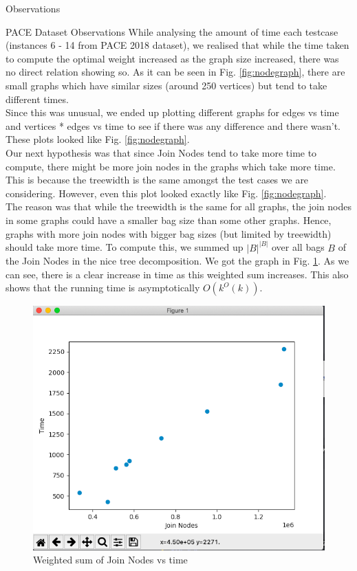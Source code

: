 \begin{section}{Observations}
\begin{subsection}{PACE Dataset Observations}
	While analysing the amount of time each testcase (instances 6 - 14 from PACE 2018 dataset), we realised that while the time taken to compute the optimal weight increased as the graph size increased, there was no direct relation showing so. As it can be seen in Fig. \ref{fig:nodegraph}, there are small graphs which have similar sizes (around 250 vertices) but tend to take different times. \\
	
	Since this was unusual, we ended up plotting different graphs for edges vs time and vertices * edges vs time to see if there was any difference and there wasn't. These plots looked like Fig. \ref{fig:nodegraph}. \\
	
	Our next hypothesis was that since Join Nodes tend to take more time to compute, there might be more join nodes in the graphs which take more time. This is because the treewidth is the same amongst the test cases we are considering. However, even this plot looked exactly like Fig. \ref{fig:nodegraph}. \\
	
	The reason was that while the treewidth is the same for all graphs, the join nodes in some graphs could have a smaller bag size than some other graphs. Hence, graphs with more join nodes with bigger bag sizes (but limited by treewidth) should take more time. To compute this, we summed up $|B|^|B|$ over all bags $B$ of the Join Nodes in the nice tree decomposition. We got the graph in Fig. \ref{fig:joingraph}. As we can see, there is a clear increase in time as this weighted sum increases. This also shows that the running time is asymptotically $O(k^O(k))$.  \\
	
	\begin{figure}
		\centering
		\includegraphics[scale=0.5]{JoinGraph}
		\caption{Weighted sum of Join Nodes vs time}
		\label{fig:joingraph}
	\end{figure}
	


\end{subsection}
\end{section}
